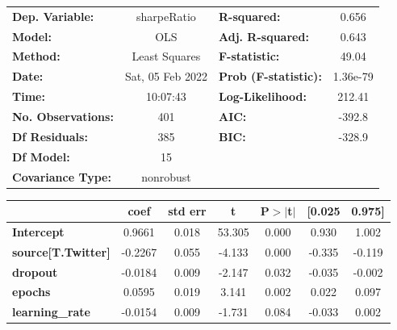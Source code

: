 \begin{center}
\begin{tabular}{lclc}
\toprule
\textbf{Dep. Variable:}              &   sharpeRatio    & \textbf{  R-squared:         } &     0.656   \\
\textbf{Model:}                      &       OLS        & \textbf{  Adj. R-squared:    } &     0.643   \\
\textbf{Method:}                     &  Least Squares   & \textbf{  F-statistic:       } &     49.04   \\
\textbf{Date:}                       & Sat, 05 Feb 2022 & \textbf{  Prob (F-statistic):} &  1.36e-79   \\
\textbf{Time:}                       &     10:07:43     & \textbf{  Log-Likelihood:    } &    212.41   \\
\textbf{No. Observations:}           &         401      & \textbf{  AIC:               } &    -392.8   \\
\textbf{Df Residuals:}               &         385      & \textbf{  BIC:               } &    -328.9   \\
\textbf{Df Model:}                   &          15      & \textbf{                     } &             \\
\textbf{Covariance Type:}            &    nonrobust     & \textbf{                     } &             \\
\bottomrule
\end{tabular}
\begin{tabular}{lcccccc}
                                     & \textbf{coef} & \textbf{std err} & \textbf{t} & \textbf{P$> |$t$|$} & \textbf{[0.025} & \textbf{0.975]}  \\
\midrule
\textbf{Intercept}                   &       0.9661  &        0.018     &    53.305  &         0.000        &        0.930    &        1.002     \\
\textbf{source[T.Twitter]}           &      -0.2267  &        0.055     &    -4.133  &         0.000        &       -0.335    &       -0.119     \\
\textbf{dropout}                     &      -0.0184  &        0.009     &    -2.147  &         0.032        &       -0.035    &       -0.002     \\
\textbf{epochs}                      &       0.0595  &        0.019     &     3.141  &         0.002        &        0.022    &        0.097     \\
\textbf{learning\_rate}              &      -0.0154  &        0.009     &    -1.731  &         0.084        &       -0.033    &        0.002     \\

\end{tabular}
\end{center}
